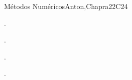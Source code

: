 \begin{syllabus}
\begin{unit}{}{Métodos Numéricos}{Anton,Chapra}{22}{C24}
   \begin{learningoutcomes}
      \item . %
      \item . %
      \item . %
      \item . %
      \end{learningoutcomes}
\end{unit}



\begin{coursebibliography}
\end{coursebibliography}

\end{syllabus}

%
